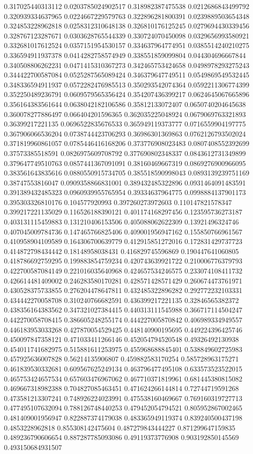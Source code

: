 \begin{table}
\begin{tabu}
\begin{sparkline}{10}
0.317025440313112 0.0203785024902517 0.318982387475538 0.0212686843499792 0.320939334637965 0.0224667229579763 0.322896281800391 0.0239889503654348 0.324853228962818 0.0258312310648138 0.326810176125245 0.0279694430339456 0.328767123287671 0.0303628765544339 0.330724070450098 0.0329656993580921 0.332681017612524 0.0357151954530157 0.334637964774951 0.0385514240210275 0.336594911937378 0.0414282758574949 0.338551859099804 0.044304696667844 0.340508806262231 0.0471415310367273 0.342465753424658 0.0498978293275243 0.344422700587084 0.0525287565089424 0.346379647749511 0.0549869549532445 0.348336594911937 0.0572282476985513 0.350293542074364 0.0592211306774399 0.352250489236791 0.0609579565356424 0.354207436399217 0.0624645067665896 0.356164383561644 0.0638042182106586 0.35812133072407 0.0650740204645638 0.360078277886497 0.066404201596365 0.362035225048924 0.0679069763321893 0.36399217221135 0.0696522835676533 0.365949119373777 0.0716559904197775 0.367906066536204 0.0738744423706293 0.36986301369863 0.0762126793502024 0.371819960861057 0.0785446416168206 0.373776908023483 0.0807408552392699 0.37573385518591 0.0826975609708792 0.377690802348337 0.0843612731349899 0.379647749510763 0.0857441367091091 0.38160469667319 0.0869276900966095 0.383561643835616 0.0880550915734705 0.385518590998043 0.0893139239751169 0.38747553816047 0.0909358866831001 0.389432485322896 0.0931464091483591 0.391389432485323 0.0960939955765954 0.39334637964775 0.0998884137901173 0.395303326810176 0.104577920993 0.397260273972603 0.110147821578347 0.399217221135029 0.116526188390121 0.401174168297456 0.123595736273187 0.403131115459883 0.131210406153506 0.405088062622309 0.13921496324746 0.407045009784736 0.147465766825406 0.409001956947162 0.155850766961567 0.410958904109589 0.164306700639779 0.412915851272016 0.172831429737723 0.414872798434442 0.18148958038431 0.416829745596869 0.190447641060805 0.418786692759295 0.199883854759234 0.420743639921722 0.210006776379793 0.422700587084149 0.221016035640968 0.424657534246575 0.233074108411732 0.426614481409002 0.246283580170281 0.428571428571429 0.260674473761971 0.430528375733855 0.276204478647811 0.432485322896282 0.292772232103331 0.434442270058708 0.310240766682591 0.436399217221135 0.32846565382372 0.438356164383562 0.347321027384415 0.440313111545988 0.366717114504247 0.442270058708415 0.386605248255174 0.444227005870842 0.406989334949557 0.446183953033268 0.427870054529425 0.448140900195695 0.449224396425746 0.450097847358121 0.471033411266146 0.452054794520548 0.49326492130938 0.454011741682975 0.515881611253975 0.455968688845401 0.538849602725983 0.457925636007828 0.56214135906807 0.459882583170254 0.585728963175271 0.461839530332681 0.609567625249134 0.463796477495108 0.633573523522015 0.465753424657534 0.657603476967062 0.467710371819961 0.681445380815082 0.469667318982388 0.704827085463451 0.471624266144814 0.72744719591268 0.473581213307241 0.748926224023991 0.475538160469667 0.769160319727713 0.477495107632094 0.788126748440253 0.479452054794521 0.805952867002465 0.481409001956947 0.822887374179038 0.483365949119374 0.839240500437198 0.4853228962818 0.855308142475604 0.487279843444227 0.871299647159835 0.489236790606654 0.887287785093086 0.49119373776908 0.903192850145569 0.493150684931507 
\end{sparkline}
\end{tabu}
\end{table}
